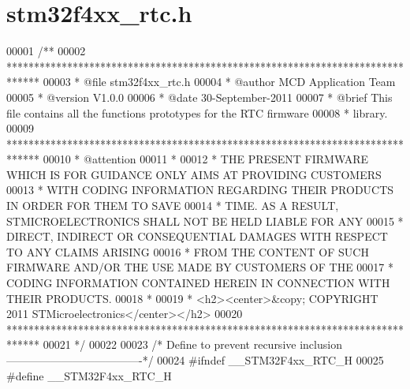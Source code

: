 \section{stm32f4xx\+\_\+rtc.\+h}
\label{stm32f4xx__rtc_8h_source}

\begin{DoxyCode}
00001 \textcolor{comment}{/**}
00002 \textcolor{comment}{  ******************************************************************************}
00003 \textcolor{comment}{  * @file    stm32f4xx\_rtc.h}
00004 \textcolor{comment}{  * @author  MCD Application Team}
00005 \textcolor{comment}{  * @version V1.0.0}
00006 \textcolor{comment}{  * @date    30-September-2011}
00007 \textcolor{comment}{  * @brief   This file contains all the functions prototypes for the RTC firmware}
00008 \textcolor{comment}{  *          library.}
00009 \textcolor{comment}{  ******************************************************************************}
00010 \textcolor{comment}{  * @attention}
00011 \textcolor{comment}{  *}
00012 \textcolor{comment}{  * THE PRESENT FIRMWARE WHICH IS FOR GUIDANCE ONLY AIMS AT PROVIDING CUSTOMERS}
00013 \textcolor{comment}{  * WITH CODING INFORMATION REGARDING THEIR PRODUCTS IN ORDER FOR THEM TO SAVE}
00014 \textcolor{comment}{  * TIME. AS A RESULT, STMICROELECTRONICS SHALL NOT BE HELD LIABLE FOR ANY}
00015 \textcolor{comment}{  * DIRECT, INDIRECT OR CONSEQUENTIAL DAMAGES WITH RESPECT TO ANY CLAIMS ARISING}
00016 \textcolor{comment}{  * FROM THE CONTENT OF SUCH FIRMWARE AND/OR THE USE MADE BY CUSTOMERS OF THE}
00017 \textcolor{comment}{  * CODING INFORMATION CONTAINED HEREIN IN CONNECTION WITH THEIR PRODUCTS.}
00018 \textcolor{comment}{  *}
00019 \textcolor{comment}{  * <h2><center>&copy; COPYRIGHT 2011 STMicroelectronics</center></h2>}
00020 \textcolor{comment}{  ****************************************************************************** }
00021 \textcolor{comment}{  */}
00022 
00023 \textcolor{comment}{/* Define to prevent recursive inclusion -------------------------------------*/}
00024 \textcolor{preprocessor}{#}\textcolor{preprocessor}{ifndef} \textcolor{preprocessor}{\_\_STM32F4xx\_RTC\_H}
00025 \textcolor{preprocessor}{#}\textcolor{preprocessor}{define} \textcolor{preprocessor}{\_\_STM32F4xx\_RTC\_H}

\end{DoxyCode}
